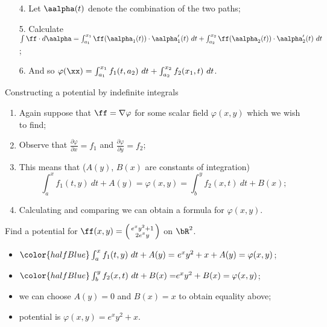         
    


    \begin{enumerate}
        \item[4.] Let \(\aalpha(t)\) denote the combination of the two paths;
        \item[5.] Calculate \(\int \ff \cdot d\aalpha = \int_{a_1}^{x_1} \ff(\aalpha_1(t))\cdot \aalpha_1'(t) \ dt +  \int_{a_2}^{x_2} \ff(\aalpha_2(t))\cdot \aalpha_2'(t) \ dt \);
        \item[6.] And so \(\varphi(\xx)  = \int_{a_1}^{x_1} f_1(t,a_2)\ dt + \int_{a_2}^{x_2} f_2(x_1,t)\ dt \).
    \end{enumerate}




    {Constructing a potential by indefinite integrals}

    \begin{enumerate}
        \item Again suppose that \(\ff = \nabla \varphi\) for some scalar field \(\varphi(x,y)\) which we wish to find;
        \item Observe that \(\frac{\partial \varphi}{\partial x} = f_1\) and  \(\frac{\partial \varphi}{\partial y} = f_2\);
        \item  This means that (\(A(y)\), \(B(x)\) are constants of integration)
        \[
            \int_{a}^{x} f_1(t,y) \ dt + A(y) = \varphi(x,y) =  \int_{b}^{y} f_2(x,t) \ dt + B(x); 
        \]
        \item Calculating and comparing we can obtain a formula for \(\varphi(x,y)\).
    \end{enumerate}
    

    \begin{example}
        Find a potential for \(\ff(x,y) = \left(\begin{smallmatrix}
            e^x y^2 + 1\\ 2e^x y
        \end{smallmatrix}\right)\) on \(\bR^2\).
        \begin{itemize}
            \item \({\color{halfBlue} \int_{a}^{x} f_1(t,y) \ dt + A(y) = } \ e^x y^2 + x + A(y) = \varphi(x,y)\);
            \item \( {\color{halfBlue} \int_{b}^{y} f_2(x,t) \ dt + B(x) = }  e^x y^2 + B(x) = \varphi(x,y) \);
            \item we can choose \(A(y) = 0\) and \(B(x)=x\) to obtain equality above;
            \item potential is \(\varphi(x,y) = e^x y^2 + x\).
        \end{itemize}
    \end{example}




